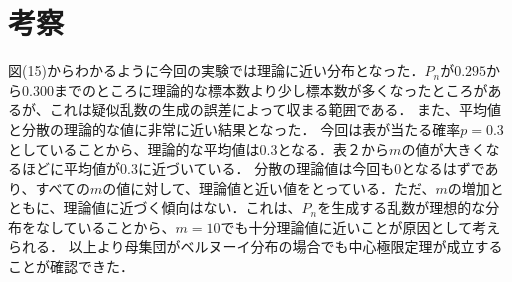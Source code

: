 \documentclass[fleqn, a4paper. 12pt]{ltjsarticle} %
\begin{document}
\section*{考察}  
図(15)からわかるように今回の実験では理論に近い分布となった．$P_n$が$0.295$から$0.300$までのところに理論的な標本数より少し標本数が多くなったところがあるが、これは疑似乱数の生成の誤差によって収まる範囲である．
また、平均値と分散の理論的な値に非常に近い結果となった．
今回は表が当たる確率$p = 0.3$としていることから、理論的な平均値は$0.3$となる．表２から$m$の値が大きくなるほどに平均値が$0.3$に近づいている．
分散の理論値は今回も$0$となるはずであり、すべての$m$の値に対して、理論値と近い値をとっている．ただ、$m$の増加とともに、理論値に近づく傾向はない．これは、$P_n$を生成する乱数が理想的な分布をなしていることから、$m = 10$でも十分理論値に近いことが原因として考えられる．
以上より母集団がベルヌーイ分布の場合でも中心極限定理が成立することが確認できた．


\newpage
\end{document}
